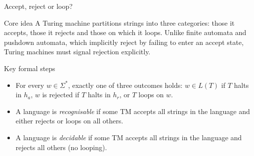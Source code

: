 \begin{frame}[t]{Accept, reject or loop?}
  \begin{tblock}{Core idea}
    A Turing machine partitions strings into three categories: those it
    accepts, those it rejects and those on which it loops.  Unlike
    finite automata and pushdown automata, which implicitly reject by
    failing to enter an accept state, Turing machines must signal
    rejection explicitly.
  \end{tblock}
  \begin{tblock}{Key formal steps}
    \begin{itemize}
      \item For every $w \in \Sigma^*$, exactly one of three outcomes holds:
        $w\in L(T)$ if $T$ halts in $h_a$, $w$ is rejected if $T$ halts
        in $h_r$, or $T$ loops on $w$.
      \item A language is \emph{recognisable} if some TM accepts all
        strings in the language and either rejects or loops on all
        others.
      \item A language is \emph{decidable} if some TM accepts all
        strings in the language and rejects all others (no looping).
    \end{itemize}
  \end{tblock}
  \label{fr:7.2-02}
\end{frame}

